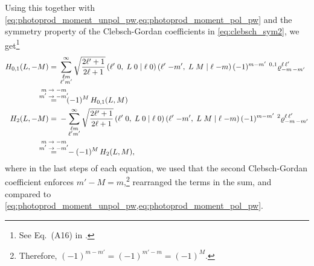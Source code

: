 Using this together with
\cref{eq:photoprod_moment_unpol_pw,eq:photoprod_moment_pol_pw} and the
symmetry property of the Clebsch-Gordan coefficients in
\cref{eq:clebsch_sym2}, we get\footnote{See Eq.~(A16) in
.}
\begin{align}
  H_{0, 1}(L, -M)
  ={}& \sum_{\substack{\ell m \\ \ell' m'}}^\infty
  \sqrt{\frac{2 \ell' + 1}{2 \ell + 1}}\,
  \clebsch{\ell'}{0}{L}{0}{\ell}{0}\, \clebsch{\ell'}{-m'}{L}{M}{\ell}{-m}\,
  (-1)^{m - m'}\, \prescript{0, 1}{}{\varrho}^{\ell\, \ell'}_{{-m}\, {-m}'} \notag
  \\
  \label{eq:photoprod_moment_01_sym_2}
  \equalUsing{$\mathclap{\substack{\displaystyle{m \to -m} \\ \displaystyle{m' \to -m'}}}$}{}& \quad
  (-1)^M\, H_{0, 1}(L, M)
  \\
  H_2(L, -M)
  ={}& -\sum_{\substack{\ell m \\ \ell' m'}}^\infty
  \sqrt{\frac{2 \ell' + 1}{2 \ell + 1}}\,
  \clebsch{\ell'}{0}{L}{0}{\ell}{0}\, \clebsch{\ell'}{-m'}{L}{M}{\ell}{-m}\,
  (-1)^{m - m'}\, \prescript{2}{}{\varrho}^{\ell\, \ell'}_{{-m}\, {-m}'} \notag
  \\
  \label{eq:photoprod_moment_2_sym_2}
  \equalUsing{$\mathclap{\substack{\displaystyle{m \to -m} \\ \displaystyle{m' \to -m'}}}$}{}& \quad
  -(-1)^M\, H_2(L, M),
\end{align}
where in the last steps of each equation, we used that the second Clebsch-Gordan
coefficient enforces $m' - M = m$,\footnote{Therefore, $(-1)^{m - m'}
= (-1)^{m' - m} = (-1)^M$.} rearranged the terms in the sum, and
compared to \cref{eq:photoprod_moment_unpol_pw,eq:photoprod_moment_pol_pw}.

